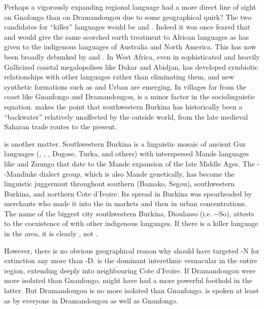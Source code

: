 \documentclass[output=paper,
modfonts
]{langscibook}
\begin{document}
Perhaps a vigorously expanding regional language had a more direct line of sight on Gnafongo than on Dramandougou due to some geographical quirk? The two candidates for “killer” languages \citep{NettleRomaine2000,Price1984} would be  and . Indeed it was once feared that  and  would give the same scorched earth treatment to African languages as  has given to the indigenous languages of Australia and North America. This has now been broadly debunked by \citet{Batibo2005} and \citet{Mufwene2009}. In West Africa, even in sophisticated and heavily Gallicized coastal megalopolises like Dakar and Abidjan,  has developed symbiotic relationships with other languages rather than eliminating them, and new synthetic formations such as  and Urban  are emerging. In villages far from the coast like Gnanfongo and Dramandougou,  is a minor factor in the sociolinguistic equation. \citet[141]{Naden1989} makes the point that southwestern Burkina has historically been a “backwater” relatively unaffected by the outside world, from the late medieval Saharan trade routes to the present.

 is another matter. Southwestern Burkina is a linguistic mosaic of ancient Gur languages (, , , Dogose, Turka, and others) with interspersed Mande languages like  and Zuungo that date to the Mande expansion of the late Middle Ages. The --Mandinke dialect group, which is also Mande genetically, has become the linguistic juggernaut throughout southern  (Bamako, Segou), southwestern Burkina, and northern Cote d’Ivoire. Its spread in Burkina was spearheaded by merchants who made it into the  in markets and then in urban concentrations. The name of the biggest city southwestern Burkina,  Dioulasso (i.e. --So), attests to the coexistence of  with other indigenous languages. If there is a killer language in the area, it is clearly , not .

However, there is no obvious geographical reason why  should have targeted -N for extinction any more than -D.  is the dominant interethnic vernacular in the entire region, extending deeply into neighbouring Cote d’Ivoire. If Dramandougou were more isolated than Gnanfongo,  might have had a more powerful foothold in the latter. But Dramandougou is no more isolated than Gnanfongo.  is spoken at least as  by everyone in Dramandougou as well as Gnanfongo.
\end{document}
